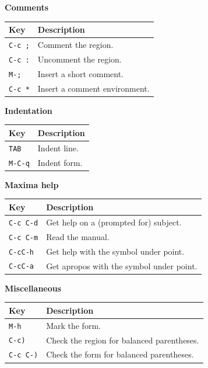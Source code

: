 \smallskip

\noindent
\textbf{Comments}

\smallskip

\noindent
\begin{tabular}{p{\firstcol}p{\secondcol}}
\hline
\textbf{Key} & \textbf{Description}\\
\hline
\texttt{C-c ;} & Comment the region.\\
\texttt{C-c :} & Uncomment the region.\\
\texttt{M-;} & Insert a short comment.\\
\texttt{C-c *} & Insert a comment environment.
\end{tabular}


\smallskip

\noindent
\textbf{Indentation}

\smallskip

\noindent
\begin{tabular}{p{\firstcol}p{\secondcol}}
\hline
\textbf{Key} & \textbf{Description}\\
\hline
\texttt{TAB} & Indent line.\\
\texttt{M-C-q} & Indent form.
\end{tabular}


\smallskip

\noindent
\textbf{Maxima help}

\smallskip

\noindent
\begin{tabular}{p{\firstcol}p{\secondcol}}
\hline
\textbf{Key} & \textbf{Description}\\
\hline
\texttt{C-c C-d}
& Get help on a (prompted for) subject.\\
\texttt{C-c C-m}
& Read the manual.\\
\texttt{C-cC-h} & Get help with the symbol under point.\\
\texttt{C-cC-a} & Get apropos with the symbol under point.
\end{tabular}

\smallskip

\noindent
\textbf{Miscellaneous}

\smallskip

\noindent
\begin{tabular}{p{\firstcol}p{\secondcol}}
\hline
\textbf{Key} & \textbf{Description}\\
\hline
\texttt{M-h} & Mark the form.\\
\texttt{C-c)} & Check the region for balanced parentheses.\\
\texttt{C-c C-)} & Check the form for balanced parentheses.
\end{tabular}

